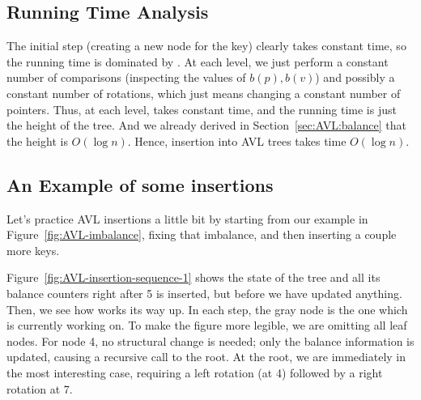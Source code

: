 \subsection{Running Time Analysis}
The initial step (creating a new node for the key) clearly takes
constant time, so the running time is dominated by .
At each level, we just perform a constant number of comparisons
(inspecting the values of $b(p), b(v)$) and possibly a constant number
of rotations, which just means changing a constant number of pointers.
Thus, at each level,  takes constant time, and the
running time is just the height of the tree. 
And we already derived in Section~\ref{sec:AVL:balance} that the
height is $O(\log n)$. 
Hence, insertion into AVL trees takes time $O(\log n)$.

\subsection{An Example of some insertions}
Let's practice AVL insertions a little bit by starting from our
example in Figure~\ref{fig:AVL-imbalance}, fixing that imbalance, and
then inserting a couple more keys.

Figure~\ref{fig:AVL-insertion-sequence-1} shows the state of the tree
and all its balance counters right after 5 is inserted, but before we
have updated anything. Then, we see how  works its
way up. 
In each step, the gray node is the one which  is
currently working on. 
To make the figure more legible, we are omitting all leaf nodes.
For node 4, no structural change is needed; only the balance
information is updated, causing a recursive call to the root.
At the root, we are immediately in the most interesting case,
requiring a left rotation (at 4) followed by a right rotation at 7.

